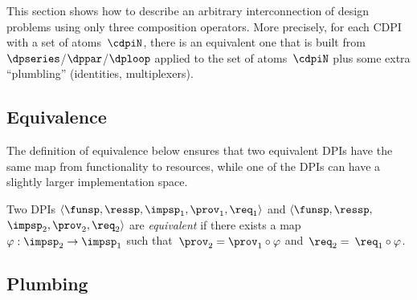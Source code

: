 \label{sec:Decomposing2}This section shows how to describe an arbitrary
interconnection of design problems using only three composition operators.
More precisely, for each CDPI with a set of atoms~$\cdpiN$, there
is an equivalent one that is built from $\dpseries$/$\dppar$/$\dploop$
applied to the set of atoms~$\cdpiN$ plus some extra ``plumbling''
(identities, multiplexers).

\subsection{Equivalence}

The definition of equivalence below ensures that two equivalent DPIs
have the same map from functionality to resources, while one of the
DPIs can have a slightly larger implementation space.
\begin{definition}
Two DPIs $\left\langle \funsp,\ressp,\impsp_{1},\prov_{1},\req_{1}\right\rangle $
and $\langle\funsp,\ressp,$ $\impsp_{2},\prov_{2},\req_{2}\rangle$
are \emph{equivalent} if there exists a map~$\varphi:\impsp_{2}\rightarrow\impsp_{1}$
such that~$\prov_{2}=\prov_{1}\circ\varphi$ and~$\req_{2}=$ $\req_{1}\circ\varphi$.
\end{definition}

\subsection{Plumbing}

